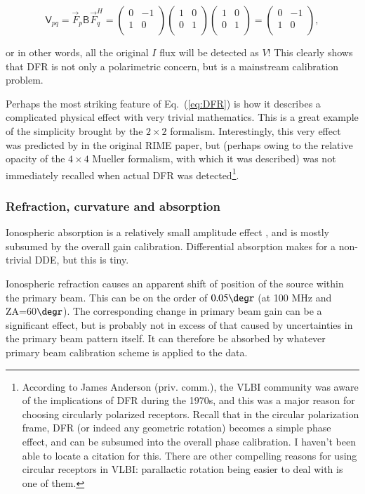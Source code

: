 \documentclass[referee]{aa}
\newcommand{\matrixtt}[4]{\left( \begin{array}{cc}#1&#2\\#3&#4\\\end{array} \right)}
\newcommand{\herm}{H}
\newcommand{\jones}[2]{\vec {#1}_{#2}}
\newcommand{\jonesT}[2]{\vec {#1}^{\herm}_{#2}}
\newcommand{\coh}[2]{\mathsf{{#1}}_{{#2}}}
\begin{document}
\begin{equation}\label{eq:DFR}
\coh{V}{pq} = \jones{F}{p}\coh{B}{}\jonesT{F}{q} = \matrixtt{0}{-1}{1}{0} \matrixtt{1}{0}{0}{1} \matrixtt{1}{0}{0}{1} = \matrixtt{0}{-1}{1}{0},
\end{equation}

or in other words, all the original $I$ flux will be detected as $V$! This clearly shows that DFR is not only a polarimetric concern, but is a mainstream calibration problem.

Perhaps the most striking feature of Eq.~(\ref{eq:DFR}) is how it describes a complicated physical effect with very trivial mathematics. This is a great example of the simplicity brought by the $2\times2$ formalism. Interestingly, this very effect was predicted by \citet{ME1} in the original RIME paper, but (perhaps owing to the relative opacity of the $4\times4$ Mueller formalism, with which it was described) was not immediately recalled when actual DFR was detected\footnote{According to James Anderson (priv. comm.), the VLBI community was aware of the implications of DFR during the 1970s, and this was a major reason for choosing circularly polarized receptors. Recall that in the circular polarization frame, DFR (or indeed any geometric rotation) becomes a simple phase effect, and can be subsumed into the overall phase calibration. I haven't been able to locate a citation for this. There are other compelling reasons for using circular receptors in VLBI: parallactic rotation being easier to deal with is one of them.}.

\subsubsection{Refraction, curvature and absorption}

Ionospheric absorption is a relatively small amplitude effect \citep[e.g. 0.1 dB at 100 MHz and ZA=60$\degr$, see][]{tms}, and is mostly subsumed by the overall gain calibration. Differential absorption makes for a non-trivial DDE, but this is tiny.

Ionospheric refraction causes an apparent shift of position of the source within the primary beam. This can be on the order of $0.05\degr$ (at 100 MHz and ZA=60$\degr$). The corresponding change in primary beam gain can be a significant effect, but is probably not in excess of that caused by uncertainties in the primary beam pattern itself. It can therefore be absorbed by whatever primary beam calibration scheme is applied to the data.
\end{document}
